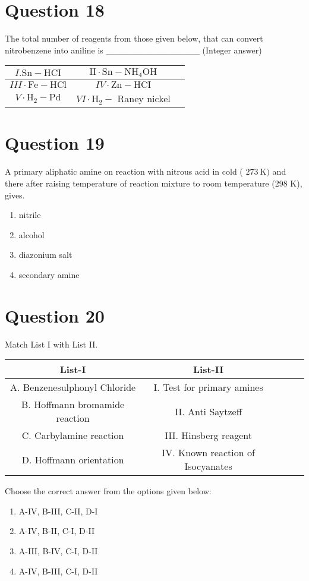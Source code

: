 \documentclass{article}
\begin{document}
\section*{Question 18}
The total number of reagents from those given below, that can convert nitrobenzene into aniline is _______________ (Integer answer)\begin{tabular}{|c|c|c|}
\hline
\(I . \mathrm{Sn}-\mathrm{HCI}\) & \(\mathrm{II} \cdot \mathrm{Sn}-\mathrm{NH}_4 \mathrm{OH}\) \\
\hline
\(I I I \cdot \mathrm{Fe}-\mathrm{HCl}\) & \(I V \cdot \mathrm{Zn}-\mathrm{HCI}\) \\
\hline
\(V \cdot \mathrm{H}_2-\mathrm{Pd}\) & \(V I \cdot \mathrm{H}_2-\) Raney nickel \\
\hline
\end{tabular}

\begin{enumerate}[label=(\alph*)]
\end{enumerate}
\newpage
\section*{Question 19}
A primary aliphatic amine on reaction with nitrous acid in cold ( \(273 \mathrm{~K})\) and there after raising temperature of reaction mixture to room temperature (298 K), gives.
\begin{enumerate}[label=(\alph*)]
\item nitrile
\item alcohol
\item diazonium salt
\item secondary amine
\end{enumerate}
\newpage
\section*{Question 20}
Match List I with List II.\begin{tabular}{|c|c|c|c|c|}
\hline
List-I & List-II \\
\hline
A. Benzenesulphonyl Chloride & I. Test for primary amines \\
\hline
B. Hoffmann bromamide reaction & II. Anti Saytzeff \\
\hline
C. Carbylamine reaction & III. Hinsberg reagent \\
\hline
D. Hoffmann orientation & IV. Known reaction of Isocyanates \\
\hline
\end{tabular}
Choose the correct answer from the options given below: \newline
\begin{enumerate}[label=(\alph*)]
\item A-IV, B-III, C-II, D-I
\item A-IV, B-II, C-I, D-II
\item A-III, B-IV, C-I, D-II
\item A-IV, B-III, C-I, D-II
\end{enumerate}
\newpage
\end{document}
